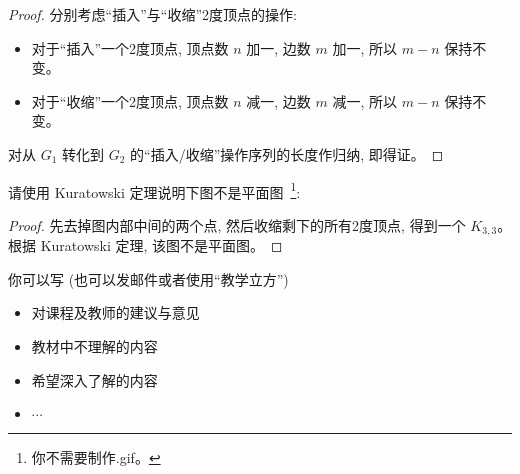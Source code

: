 \documentclass[a4paper, justified]{tufte-handout}
\begin{document}
\begin{proof}
  分别考虑``插入''与``收缩''2度顶点的操作:
  \begin{itemize}
    \item 对于``插入''一个2度顶点, 顶点数 $n$ 加一, 边数 $m$ 加一, 所以 $m-n$ 保持不变。
    \item 对于``收缩''一个2度顶点, 顶点数 $n$ 减一, 边数 $m$ 减一, 所以 $m-n$ 保持不变。
  \end{itemize}
  对从 $G_{1}$ 转化到 $G_{2}$ 的``插入/收缩''操作序列的长度作归纳, 即得证。
\end{proof}

\begin{problem}
  请使用 Kuratowski 定理说明下图不是平面图~\footnote{你不需要制作\textsf{.gif}。}:
\end{problem}

\begin{proof}
  先去掉图内部中间的两个点, 然后收缩剩下的所有2度顶点, 得到一个 $K_{3,3}$。
  根据 Kuratowski 定理, 该图不是平面图。
\end{proof}

\begincorrection

\beginfb

你可以写 (也可以发邮件或者使用``教学立方'')
\begin{itemize}
  \item 对课程及教师的建议与意见
  \item 教材中不理解的内容
  \item 希望深入了解的内容
  \item $\cdots$
\end{itemize}
\end{document}
